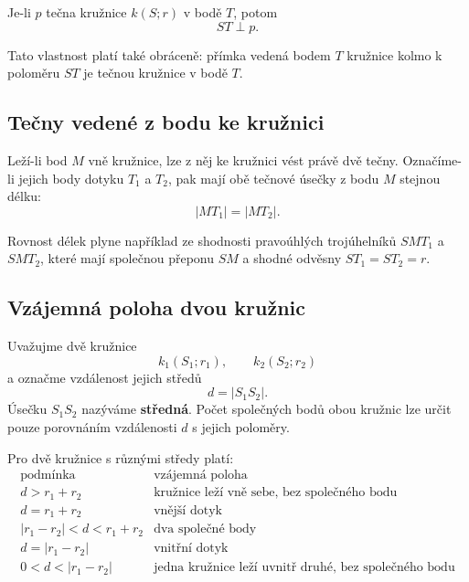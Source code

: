 \documentclass[12pt,a4paper]{article}
\begin{document}
\begin{definitionbox}
    Je-li $p$ tečna kružnice $k(S;r)$ v bodě $T$, potom
    \[
        ST\perp p.
    \]
\end{definitionbox}

Tato vlastnost platí také obráceně: přímka vedená bodem $T$ kružnice kolmo k poloměru $ST$ je tečnou kružnice v bodě $T$.

\subsection{Tečny vedené z bodu ke kružnici}

Leží-li bod $M$ vně kružnice, lze z něj ke kružnici vést právě dvě tečny. Označíme-li jejich body dotyku $T_1$ a $T_2$,
pak mají obě tečnové úsečky z bodu $M$ stejnou délku:
\[
    |MT_1|=|MT_2|.
\]

\begin{center}
\end{center}

Rovnost délek plyne například ze shodnosti pravoúhlých trojúhelníků $SMT_1$ a $SMT_2$, které mají společnou přeponu
$SM$ a shodné odvěsny $ST_1=ST_2=r$.

\subsection{Vzájemná poloha dvou kružnic}

Uvažujme dvě kružnice
\[
    k_1(S_1;r_1), \qquad k_2(S_2;r_2)
\]
a označme vzdálenost jejich středů
\[
    d=|S_1S_2|.
\]
Úsečku $S_1S_2$ nazýváme \textbf{středná}. Počet společných bodů obou kružnic lze určit pouze porovnáním vzdálenosti
$d$ s jejich poloměry.

\begin{definitionbox}
    Pro dvě kružnice s různými středy platí:
    \[
    \begin{array}{c|c}
        \text{podmínka} & \text{vzájemná poloha} \\
        \hline
        d>r_1+r_2 & \text{kružnice leží vně sebe, bez společného bodu} \\
        d=r_1+r_2 & \text{vnější dotyk} \\
        |r_1-r_2|<d<r_1+r_2 & \text{dva společné body} \\
        d=|r_1-r_2| & \text{vnitřní dotyk} \\
        0<d<|r_1-r_2| & \text{jedna kružnice leží uvnitř druhé, bez společného bodu}
    \end{array}
    \]
\end{definitionbox}
\end{document}
